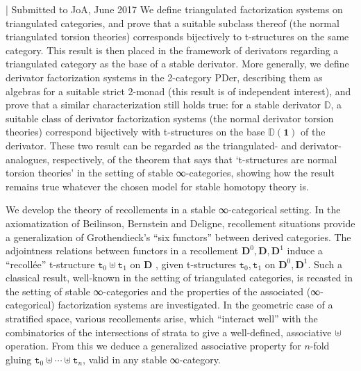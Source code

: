 \begin{eyenumerate}
   \item {}
   { | Submitted to JoA, June 2017}
   {We define triangulated factorization systems on triangulated categories, and prove that a suitable subclass thereof (the normal triangulated torsion theories) corresponds bijectively to t-structures on the same category. This result is then placed in the framework of derivators regarding a triangulated category as the base of a stable derivator. More generally, we define derivator factorization systems in the 2-category $\mathrm{PDer}$, describing them as algebras for a suitable strict 2-monad (this result is of independent interest), and prove that a similar characterization still holds true: for a stable derivator $\mathbb D$, a suitable class of derivator factorization systems (the normal derivator torsion theories) correspond bijectively with t-structures on the base $\mathbb{D}(\textbf{1})$ of the derivator. These two result can be regarded as the triangulated- and derivator- analogues, respectively, of the theorem that says that `t-structures are normal torsion theories' in the setting of stable ∞-categories, showing how the result remains true whatever the chosen model for stable homotopy theory is.}
   \item {}
   {}
   {We develop the theory of recollements in a stable ∞-categorical setting. In the axiomatization of Beilinson, Bernstein and Deligne, recollement situations provide a generalization of Grothendieck's ``six functors'' between derived categories. The adjointness relations between functors in a recollement $\textbf{D}^0, \textbf{D} , \textbf{D}^1$ induce a ``recoll\'ee'' t-structure $\texttt{t}_0\uplus\texttt{t}_1$ on $\textbf{D}$ , given t-structures $\texttt{t}_0,\texttt{t}_1$ on $\textbf{D}^0, \textbf{D}^1$. Such a classical result, well-known in the setting of triangulated categories, is recasted in the setting of stable ∞-categories and the properties of the associated (∞-categorical) factorization systems are investigated. In the geometric case of a stratified space, various recollements arise, which ``interact well'' with the combinatorics of the intersections of strata to give a well-defined, associative $\uplus$ operation. From this we deduce a generalized associative property for $n$-fold gluing $\texttt{t}_0\uplus\cdots\uplus \texttt{t}_n$, valid in any stable ∞-category.}
\end{eyenumerate}
